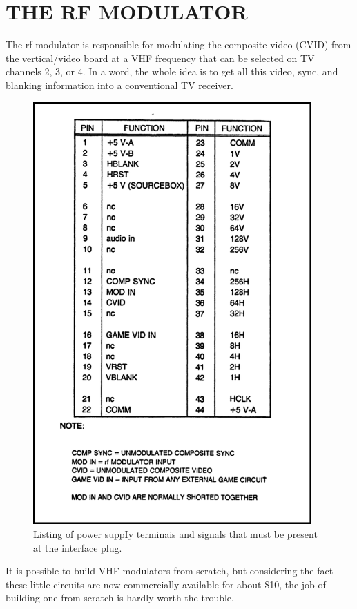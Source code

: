 \documentclass[11pt]{book}              %
\begin{document}
\section{THE RF MODULATOR}

The rf modulator is responsible for modulating the composite video (CVID) from the vertical/video board at a VHF frequency that can be selected on TV channels 2, 3, or 4. In a word, the whole idea is to get all this video, sync, and blanking information into a conventional TV receiver.

\begin{figure}
  \centering
  \includegraphics[width=0.95\textwidth]{images/fig2-11}
  \caption{Listing of power suppIy terminais and signals that must be present at the interface plug.}
\end{figure}

It is possible to build VHF modulators from scratch, but considering the fact these little circuits are now commercially available for about \$10, the job of building one from scratch is hardly worth the trouble.
\end{document}
